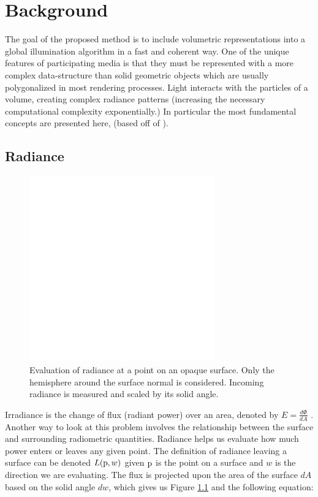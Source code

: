 \chapter{Background}
\label{background}

The goal of the proposed method is to include volumetric representations into a global illumination algorithm in a fast and coherent way. One of the unique features of participating media is that they must be represented with a more complex data-structure than solid geometric objects which are usually polygonalized in most rendering processes.  Light interacts with the particles of a volume, creating complex radiance patterns (increasing the necessary computational complexity exponentially.) In particular the most fundamental concepts are presented here,  (based off of  \cite{pbrt}).

\section{Radiance}

\begin{figure}[h!]
    \centering
    \includegraphics[width=80mm]{../img/radiance.pdf}
    \captionfonts
    \caption{Evaluation of radiance at a point on an opaque surface.  Only the hemisphere around the surface normal is considered.  Incoming radiance is measured and scaled by its solid angle.}
    \label{fig:radiance}
\end{figure}

Irradiance is the change of flux (radiant power) over an area, denoted by $E = \frac{d\Phi}{dA}$ \cite{aga}. Another way to look at this problem involves the relationship between the surface and surrounding radiometric quantities.  Radiance helps us evaluate how much power enters or leaves any given point.  The definition of radiance leaving a surface can be denoted $L(\textup{p}, w)$ given $\textup{p}$ is the point on a surface and $w$ is the direction we are evaluating.  The flux is projected upon the area of the surface $dA$ based on the solid angle $dw$, which gives us Figure \ref{fig:radiance} and the following equation:

